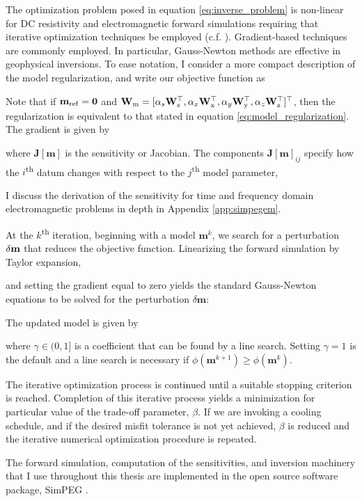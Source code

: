 The optimization problem posed in equation \ref{eq:inverse_problem} is non-linear for DC resistivity and electromagnetic forward simulations requiring that iterative optimization techniques be employed (c.f. \cite{Nocedal1999}). Gradient-based techniques are commonly employed. In particular, Gauss-Newton methods are effective in geophysical inversions. To ease notation, I consider a more compact description of the model regularization, and write our objective function as

Note that if $\mathbf{m}_{\rm ref} = \mathbf{0}$ and $\mathbf{W}_{\rm m} = [\alpha_s\mathbf{W}_{\rm s}^\top, \alpha_x\mathbf{W}_{\rm x}^\top, \alpha_y\mathbf{W}_{\rm y}^\top, \alpha_z\mathbf{W}_{\rm z}^\top]^\top$, then the regularization is equivalent to that stated in equation \ref{eq:model_regularization}. The gradient is given by

where $\mathbf{J}[\mathbf{m}]$ is the sensitivity or Jacobian. The components $\mathbf{J}[\mathbf{m}]_{ij}$ specify how the $i$\textsuperscript{th} datum changes with respect to the $j$\textsuperscript{th} model parameter,

I discuss the derivation of the sensitivity for time and frequency domain electromagnetic problems in depth in Appendix \ref{app:simpegem}.

At the $k$\textsuperscript{th} iteration, beginning with a model $\mathbf{m}^{k}$, we search for a perturbation $\delta \mathbf{m}$ that reduces the objective function. Linearizing the forward simulation by Taylor expansion,

and setting the gradient equal to zero yields the standard Gauss-Newton equations
to be solved for the perturbation $\delta \mathbf{m}$:

The updated model is given by

where $\gamma \in (0,1]$ is a coefficient that can be found by a line search.
Setting $\gamma=1$ is the default and a line search is necessary if $\phi(\mathbf{m}^{k+1}) \ge \phi(\mathbf{m}^{k})$.

The iterative optimization process is continued until a suitable stopping criterion is reached.
Completion of this iterative process yields a minimization for particular value of the trade-off parameter, $\beta$. If we are invoking a cooling schedule, and if the desired misfit tolerance is not yet achieved, $\beta$ is reduced and the iterative numerical optimization procedure is repeated.

The forward simulation, computation of the sensitivities, and inversion machinery that I use throughout this thesis are implemented in the open source software package, SimPEG \citep{Cockett2015, Heagy2017}.



